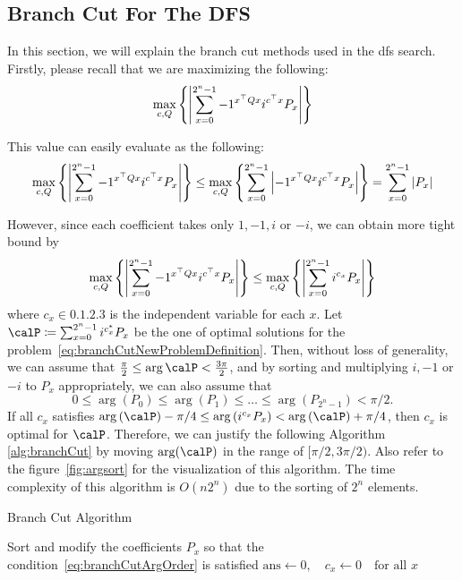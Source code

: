 \documentclass[\main/main]{subfiles}
\begin{document}
\subsection{Branch Cut For The DFS}

In this section, we will explain the branch cut methods used in the dfs search.
Firstly, please recall that we are maximizing the following:
\begin{equation*}
  \max_{c,Q} \qty{ \abs{\sum_{x=0}^{2^n-1} -1^{x^\top Q x} i^{c^\top x} P_x} }
\end{equation*}

This value can easily evaluate as the following:
\begin{equation*}
  \max_{c,Q} \qty{ \abs{\sum_{x=0}^{2^n-1} -1^{x^\top Q x} i^{c^\top x} P_x} }
  \leq \max_{c,Q} \qty{ \sum_{x=0}^{2^n-1} \abs{-1^{x^\top Q x} i^{c^\top x} P_x} }
  = \sum_{x=0}^{2^n-1} \abs{P_x}
\end{equation*}

However, since each coefficient takes only $1, -1, i$ or $-i$,
we can obtain more tight bound by
\begin{equation}\label{eq:branchCutNewProblemDefinition}
  \max_{c,Q} \qty{ \abs{\sum_{x=0}^{2^n-1} -1^{x^\top Q x} i^{c^\top x} P_x} }
  \leq \max_{c,Q} \qty{ \abs{\sum_{x=0}^{2^n-1} i^{c_x} P_x} }
\end{equation}
where $c_x \in \qty{0, 1, 2, 3}$ is the independent variable for each $x$.
Let $\calP \defeq \sum_{x=0}^{2^n-1} i^{c_x^*} P_x$ be
the one of optimal solutions for the problem~\eqref{eq:branchCutNewProblemDefinition}.
Then, without loss of generality,
we can assume that $\frac{\pi}{2} \leq \arg \calP < \frac{3\pi}{2}$,
and by sorting and multiplying $i,-1$ or $-i$ to $P_x$ appropriately,
we can also assume that
\begin{equation}\label{eq:branchCutArgOrder}
  0 \leq \arg{(P_0)} \leq \arg{(P_1)} \leq \dots \leq \arg{(P_{2^n-1})} < \pi/2.
\end{equation}
If all $c_x$ satisfies $\arg{(\calP)} - \pi/4 \leq \arg{\qty(i^{c_x} P_x)} < \arg{(\calP)} + \pi/4$,
then $c_x$ is optimal for $\calP$.
Therefore, we can justify the following Algorithm \ref{alg:branchCut}
by moving $\arg(\calP)$ in the range of $[\pi/2, 3\pi/2)$.
Also refer to the figure~\ref{fig:argsort} for the visualization of this algorithm.
The time complexity of this algorithm is $O(n2^n)$
due to the sorting of $2^n$ elements.

\begin{algorithm}
  \caption{Branch Cut Algorithm}
  \label{alg:branchCut}
  Sort and modify the coefficients $P_x$ so that the condition~\eqref{eq:branchCutArgOrder} is satisfied\;
  $\mathrm{ans} \leftarrow 0, \quad c_x \leftarrow 0 \quad \text{for all } x$\;
\end{algorithm}
\end{document}
